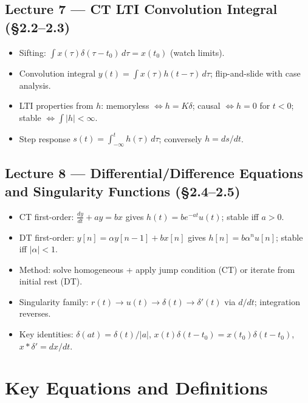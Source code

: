 \documentclass[11pt]{article}
\begin{document}
\subsection{Lecture 7 --- CT LTI Convolution Integral (\S 2.2--2.3)}
\begin{itemize}[leftmargin=*]
    \item Sifting: $\int x(\tau)\delta(\tau-t_0)\,d\tau = x(t_0)$ (watch limits).
    \item Convolution integral $y(t) = \int x(\tau)h(t-\tau)\,d\tau$; flip-and-slide with case analysis.
    \item LTI properties from $h$: memoryless $\iff h = K\delta$; causal $\iff h=0$ for $t<0$; stable $\iff \int|h|<\infty$.
    \item Step response $s(t) = \int_{-\infty}^{t}h(\tau)\,d\tau$; conversely $h = ds/dt$.
\end{itemize}

\subsection{Lecture 8 --- Differential/Difference Equations and Singularity Functions (\S 2.4--2.5)}
\begin{itemize}[leftmargin=*]
    \item CT first-order: $\tfrac{dy}{dt}+ay = bx$ gives $h(t) = be^{-at}u(t)$; stable iff $a>0$.
    \item DT first-order: $y[n] = \alpha y[n-1] + bx[n]$ gives $h[n] = b\alpha^n u[n]$; stable iff $|\alpha|<1$.
    \item Method: solve homogeneous + apply jump condition (CT) or iterate from initial rest (DT).
    \item Singularity family: $r(t) \to u(t) \to \delta(t) \to \delta'(t)$ via $d/dt$; integration reverses.
    \item Key identities: $\delta(at) = \delta(t)/|a|$, $x(t)\delta(t-t_0) = x(t_0)\delta(t-t_0)$, $x*\delta' = dx/dt$.
\end{itemize}

\section{Key Equations and Definitions}
\end{document}
